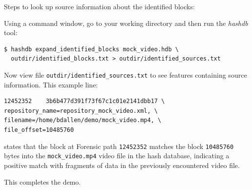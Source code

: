 \documentclass[12pt,twoside]{article}
\newcommand{\hdb}{\emph{hashdb}\xspace}
\begin{document}
Steps to look up source information about the identified blocks:
\begin{compactenum}
\item Using a command window, go to your working directory and then run
the \hdb tool:
\begin{verbatim}
$ hashdb expand_identified_blocks mock_video.hdb \
  outdir/identified_blocks.txt > outdir/identified_sources.txt
\end{verbatim}

\item Now view file \texttt{outdir/identified\_sources.txt} to see
features containing source information.
This example line:
\begin{verbatim}
12452352    3b6b477d391f73f67c1c01e2141dbb17 \
repository_name=repository_mock_video.xml, \
filename=/home/bdallen/demo/mock_video.mp4, \
file_offset=10485760
\end{verbatim}

states that the block at Forensic path \texttt{12452352}
matches the block \texttt{10485760} bytes into the
\texttt{mock\_video.mp4} video file
in the hash database,
indicating a positive match with fragments of data
in the previously encountered video file.
\end{compactenum}

This completes the demo.
\end{document}
